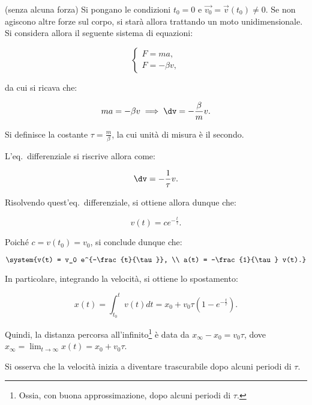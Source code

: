 \documentclass[11pt]{article}
\begin{document}
	\begin{example} (senza alcuna forza)
		Si pongano le condizioni $t_0 = 0$ e $\Vec{v_0} = \Vec{v}(t_0) \neq 0$. Se non agiscono altre forze sul corpo, si starà
		allora trattando un moto unidimensionale. Si considera
		allora il seguente sistema di equazioni:
		
		\[ \begin{cases} F = ma, \\ F = -\beta v, \end{cases} \]
		
		da cui si ricava che:
		
		\[ ma=-\beta v \implies \dv=-\frac{\beta}{m} v. \]
		
		Si definisce la costante $\tau = \frac{m}{\beta}$,
		la cui unità di misura è il secondo.
		
		L'eq.~differenziale si riscrive allora come:
		
		\[ \dv = -\frac{1}{\tau} v. \]
		
		Risolvendo quest'eq.~differenziale, si ottiene allora
		dunque che:
		
		\[ v(t) = c e^{-\frac{t}{\tau}}. \]
		
		Poiché $c = v(t_0) = v_0$, si conclude dunque che:
		
		\[ \system{v(t) = v_0 e^{-\frac{t}{\tau}}, \\ a(t) = -\frac{1}{\tau} v(t).} \]
		
		\vskip 0.1in
		
		In particolare, integrando la velocità, si ottiene lo
		spostamento:
		
		\[ x(t) = \int_{t_0}^t v(t) dt = x_0 + v_0 \tau (1- e^{-\frac{t}{\tau}}). \]
		
		Quindi, la distanza percorsa all'infinito\footnote{Ossia, con
			buona approssimazione, dopo alcuni periodi di $\tau$.} è
		data da $x_\infty - x_0 = v_0 \tau$, dove $x_\infty = \lim_{t \to \infty} x(t) = x_0 + v_0 \tau$.
		
	\end{example}
	
	\begin{remark}
		Si osserva che la velocità inizia a diventare
		trascurabile dopo alcuni periodi di $\tau$.
	\end{remark}
	
\end{document}
